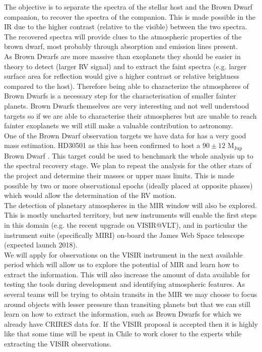 \documentclass[pdftex,12pt,a4paper]{article}
\begin{document}
The objective is to separate the spectra of the stellar host and the Brown Dwarf companion, to recover the spectra of the companion. This is made possible in the IR due to the higher contrast (relative to the visible) between the two spectra. The recovered spectra will provide clues to the atmospheric properties of the brown dwarf, most probably through absorption and emission lines present. \\
 
As Brown Dwarfs are more massive than exoplanets they should be easier in theory to detect (larger RV signal) and to extract the faint spectra (e.g. larger surface area for reflection would give a higher contrast or relative brightness compared to the host). Therefore being able to characterize the atmospheres of Brown Dwarfs is a necessary step for the characterisation of smaller fainter planets. Brown Dwarfs themselves are very interesting and not well understood targets so if we are able to characterise their atmospheres but are unable to reach fainter exoplanets we will still make a valuable contribution to astronomy. \\

One of the Brown Dwarf observation targets we have data for has a very good mass estimation. HD30501 as this has been confirmed to host a $90\pm12$ M$_{\textrm{Jup}}$ Brown Dwarf \citep{Sahlmann2011}. This target could be used to benchmark the whole analysis up to the spectral recovery stage. We plan to repeat the analysis for the other stars of the project and determine their masses or upper mass limits. This is made possible by two or more observational epochs (ideally placed at opposite phases) which would allow the determination of the RV motion. \\

The detection of planetary atmospheres in the MIR window will also be explored. This is mostly uncharted territory, but new instruments will enable the first steps in this domain (e.g. the recent upgrade on VISIR@VLT), and in particular the instrument suite (specifically MIRI) on-board the James Web Space telescope (expected launch 2018). \\

We will apply for observations on the VISIR instrument in the next available period which will allow us to explore the potential of MIR and learn how to extract the information. This will also increase the amount of data available for testing the tools during development and identifying atmospheric features. As several teams will be trying to obtain transits in the MIR we may choose to focus around objects with lesser pressure than transiting planets but that we can still learn on how to extract the information, such as Brown Dwarfs for which we already have CRIRES data for. If the VISIR proposal is accepted then it is highly like that some time will be spent in Chile to work closer to the experts while extracting the VISIR observations.\\
\end{document}
